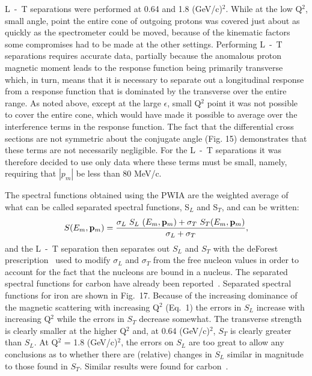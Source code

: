 \documentclass[aps,prl,twocolumn,showpacs,amsmath,amssymb,floats]{revtex4}
\begin{document}
L~-~T separations were performed at 0.64 and 1.8 (GeV/c)$^2$.  While at the low 
Q$^2$, small angle, point the entire cone of outgoing protons was covered just 
about as quickly as the spectrometer could be moved, because of the kinematic 
factors some compromises had to be made at the other settings. Performing L~-~T 
separations requires accurate data, partially because the anomalous proton 
magnetic moment leads to the response function being primarily transverse which, 
in turn, means that it is necessary to separate out a longitudinal response from 
a response function that is dominated by the transverse over the entire range.  
As noted above, except at the large $\epsilon$, small Q$^2$ point it was not 
possible to cover the entire cone, which would have made it possible to average 
over the interference terms in the response function.  The fact that the 
differential cross sections are not symmetric about the conjugate angle (Fig. 
15) demonstrates that these terms are not necessarily negligible.  For the L~-~T separations it was therefore decided to use only 
data where these terms must be small, namely, requiring that $|p_m|$ be less 
than 80 MeV/c. 

The spectral functions obtained using the PWIA are the weighted average of what 
can be called separated spectral functions, S$_L$ and S$_T$, and can be written:
\begin{equation}
S(E_m,{\bf p}_m) = \frac{\sigma_L~S_L~(E_m,{\bf p}_m) + \sigma_T~S_T(E_m,{\bf 
p}_m)}{\sigma_L + \sigma_T},
\end{equation}
\noindent      
and the L~-~T separation then separates out $S_L$ and $S_T$ with the deForest 
prescription~\cite{defor83} used to modify $\sigma_L$ and $\sigma_T$ from the 
free nucleon values in order to account for the fact that the nucleons are bound 
in a nucleus. The separated spectral functions for carbon have already been 
reported~\cite{prl1}.  Separated spectral functions for iron are shown in 
Fig.~17.  Because of the increasing dominance of the magnetic scattering with 
increasing Q$^2$ (Eq.~1) the errors in $S_L$ increase with increasing 
Q$^2$ while the errors in $S_T$ decrease somewhat.  The transverse strength is 
clearly smaller at the higher Q$^2$ and, at 0.64 (GeV/c)$^2$, $S_T$ is 
clearly greater than $S_L$.  At Q$^2$ = 1.8 (GeV/c)$^2$, the errors on $S_L$ are too 
great to allow any conclusions as to whether there are (relative) changes in 
$S_L$ similar in magnitude to those found in $S_T$.  Similar results were found 
for carbon~\cite{prc2}.  
\end{document}
